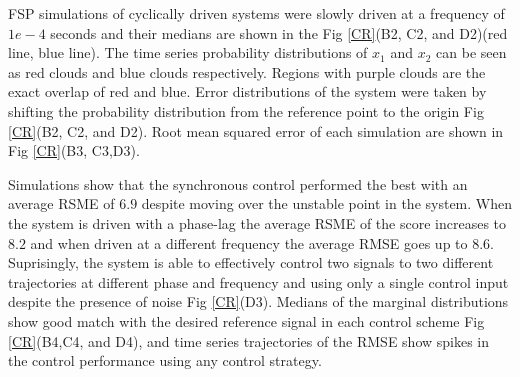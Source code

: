 \documentclass[12pt]{iopart}
\begin{document}
FSP simulations of cyclically driven systems were slowly driven at a frequency of $1e-4$ seconds and their medians are shown in the Fig \ref{CR}(B2, C2, and D2)(red line, blue line). The time series probability distributions of $x_1$ and $x_2$ can be seen as red clouds and blue clouds respectively. Regions with purple clouds are the exact overlap of red and blue. Error distributions of the system were taken by shifting the probability distribution from the reference point to the origin Fig \ref{CR}(B2, C2, and D2). Root mean squared error of each simulation are shown in Fig \ref{CR}(B3, C3,D3). 

Simulations show that the synchronous control performed the best with an average RSME of $6.9$ despite moving over the unstable point in the system. When the system is driven with a phase-lag the average RSME of the score increases to $8.2$ and when driven at a different frequency the average RMSE goes up to $8.6$.  
Suprisingly, the system is able to effectively control two signals to two different trajectories at different phase and frequency and using only a single control input despite the presence of noise Fig \ref{CR}(D3). Medians of the marginal distributions show good match with the desired reference signal in each control scheme Fig \ref{CR}(B4,C4, and D4), and time series trajectories of the RMSE show spikes in the control performance using any control strategy.
\end{document}
